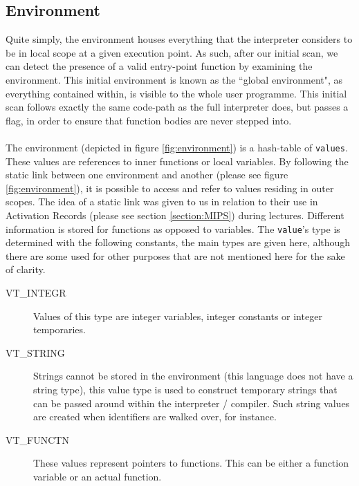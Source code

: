 \subsection{Environment}
Quite simply, the environment houses everything that the interpreter considers to be in local scope at a given execution point. As such, after our initial scan, we can detect the presence of a valid entry-point function by examining the environment. This initial environment is known as the ``global environment", as everything contained within, is visible to the whole user programme. This initial scan follows exactly the same code-path as the full interpreter does, but passes a flag, in order to ensure that function bodies are never stepped into.
\ \\ \ \\
The environment (depicted in figure \ref{fig:environment}) is a hash-table of \verb!values!. These values are references to inner functions or local variables. By following the static link between one environment and another (please see figure \ref{fig:environment}), it is possible to access and refer to values residing in outer scopes. The idea of a static link was given to us in relation to their use in Activation Records (please see section \ref{section:MIPS}) during lectures. Different information is stored for functions as opposed to variables. The \verb!value!'s type is determined with the following constants, the main types are given here, although there are some used for other purposes that are not mentioned here for the sake of clarity.

\begin{description}
	\item[VT\_INTEGR] Values of this type are integer variables, integer constants or integer temporaries.
	\item[VT\_STRING] Strings cannot be stored in the environment (this language does not have a string type), this value type is used to construct temporary strings that can be passed around within the interpreter / compiler. Such string values are created when identifiers are walked over, for instance.
	\item[VT\_FUNCTN] These values represent pointers to functions. This can be either a function variable or an actual function.
\end{description}

